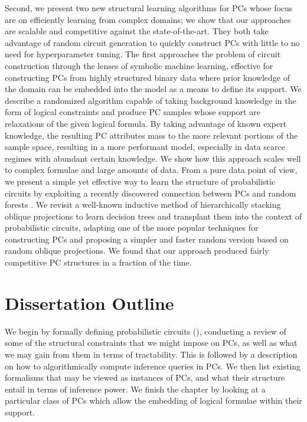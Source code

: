 Second, we present two new structural learning algorithms for PCs whose focus are on efficiently
learning from complex domains; we show that our approaches are scalable and competitive against the
state-of-the-art. They both take advantage of random circuit generation to quickly construct PCs
with little to no need for hyperparameter tuning. The first approaches the problem of circuit
construction through the lenses of symbolic machine learning, effective for constructing PCs from
highly structured binary data where prior knowledge of the domain can be embedded into the model as
a means to define its support. We describe a randomized algorithm capable of taking background
knowledge in the form of logical constraints and produce PC samples whose support are relaxations
of the given logical formula. By taking advantage of known expert knowledge, the resulting PC
attributes mass to the more relevant portions of the sample space, resulting in a more performant
model, especially in data scarce regimes with abundant certain knowledge. We show how this approach
scales well to complex formulae and large amounts of data. From a pure data point of view, we
present a simple yet effective way to learn the structure of probabilistic circuits by exploiting a
recently discovered connection between PCs and random forests \citep{correia20}. We revisit a
well-known inductive method of hierarchically stacking oblique projections to learn decision trees
\citep{dasgupta08a,dasgupta08b} and transplant them into the context of probabilistic circuits,
adapting one of the more popular techniques for constructing PCs and proposing a simpler and faster
random version based on random oblique projections. We found that our approach produced fairly
competitive PC structures in a fraction of the time.

\section{Dissertation Outline}

We begin  by formally defining probabilistic circuits (), conducting a
review of some of the structural constraints that we might impose on PCs, as well as what we may
gain from them in terms of tractability. This is followed by a description on how to
algorithmically compute inference queries in PCs. We then list existing formalisms that may be
viewed as instances of PCs, and what their structure entail in terms of inference power. We finish
the chapter by looking at a particular class of PCs which allow the embedding of logical formulae
within their support.


